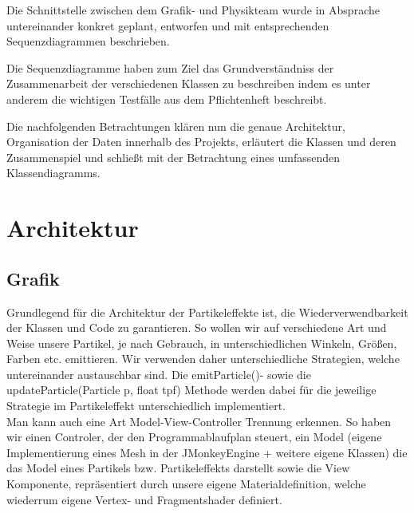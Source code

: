 \documentclass[parskip=full]{scrartcl}
\begin{document}
	Die Schnittstelle zwischen dem Grafik- und Physikteam wurde in Absprache untereinander konkret geplant, entworfen 
	und mit entsprechenden Sequenzdiagrammen beschrieben.\par
	Die Sequenzdiagramme haben zum Ziel das Grundverständniss der Zusammenarbeit der verschiedenen Klassen zu beschreiben 
	indem es unter anderem die wichtigen Testfälle aus dem Pflichtenheft beschreibt.\par
	Die nachfolgenden Betrachtungen klären nun die genaue Architektur, Organisation der Daten innerhalb des Projekts,
	erläutert die Klassen und deren Zusammenspiel und schließt mit der Betrachtung eines umfassenden Klassendiagramms.
	\pagebreak

	
	\section{Architektur}

	\subsection{Grafik}
		Grundlegend für die Architektur der Partikeleffekte ist, die Wiederverwendbarkeit der Klassen
		und Code zu garantieren. So wollen wir auf verschiedene Art und Weise unsere Partikel, je
		nach Gebrauch, in unterschiedlichen Winkeln, Größen, Farben etc. emittieren. Wir verwenden daher
		unterschiedliche Strategien, welche untereinander austauschbar sind.
		Die emitParticle()- sowie die updateParticle(Particle p, float tpf) Methode werden dabei für
		die jeweilige Strategie im Partikeleffekt unterschiedlich implementiert. \\
		Man kann auch eine Art Model-View-Controller Trennung erkennen. So haben wir einen Controler, 
		der den Programmablaufplan steuert, ein Model (eigene Implementierung eines 
		Mesh in der JMonkeyEngine + weitere eigene Klassen) die das Model eines Partikels bzw. 
		Partikeleffekts darstellt sowie die View Komponente, repräsentiert durch unsere eigene 
		Materialdefinition, welche wiederrum eigene Vertex- und Fragmentshader definiert.
			

	

	\pagebreak
\end{document}
